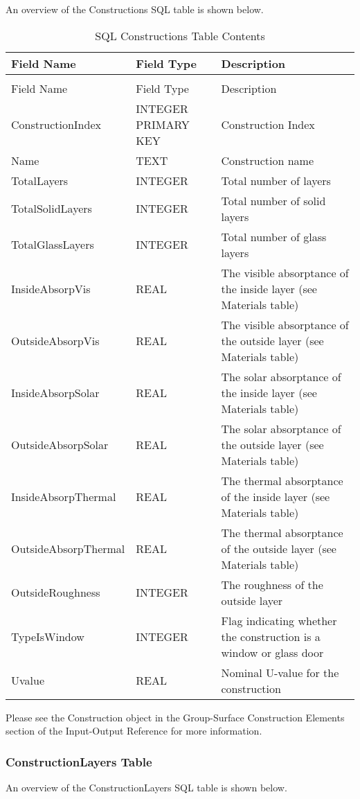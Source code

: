 An overview of the Constructions SQL table is shown below.

\begin{longtable}[c]{>{\raggedright}p{1.5in}>{\raggedright}p{1.5in}>{\raggedright}p{3.0in}}
\caption{SQL Constructions Table Contents \label{table:table-26.-sql-constructions-table-contents}} \tabularnewline
\toprule 
Field Name & Field Type & Description \tabularnewline
\midrule
\endfirsthead

\caption[]{SQL Constructions Table Contents} \tabularnewline
\toprule 
Field Name & Field Type & Description \tabularnewline
\midrule
\endhead

Construction\-Index & INTEGER PRIMARY KEY & Construction Index \tabularnewline
Name & TEXT & Construction name \tabularnewline
TotalLayers & INTEGER & Total number of layers \tabularnewline
TotalSolidLayers & INTEGER & Total number of solid layers \tabularnewline
TotalGlassLayers & INTEGER & Total number of glass layers \tabularnewline
InsideAbsorpVis & REAL & The visible absorptance of the inside layer (see Materials table) \tabularnewline
OutsideAbsorpVis & REAL & The visible absorptance of the outside layer (see Materials table) \tabularnewline
InsideAbsorpSolar & REAL & The solar absorptance of the inside layer (see Materials table) \tabularnewline
OutsideAbsorpSolar & REAL & The solar absorptance of the outside layer (see Materials table) \tabularnewline
InsideAbsorp\-Thermal & REAL & The thermal absorptance of the inside layer (see Materials table) \tabularnewline
OutsideAbsorp\-Thermal & REAL & The thermal absorptance of the outside layer (see Materials table) \tabularnewline
OutsideRoughness & INTEGER & The roughness of the outside layer \tabularnewline
TypeIsWindow & INTEGER & Flag indicating whether the construction is a window or glass door \tabularnewline
Uvalue & REAL & Nominal U-value for the construction \tabularnewline
\bottomrule
\end{longtable}

Please see the Construction object in the Group-Surface Construction Elements section of the Input-Output Reference for more information.

\subsubsection{ConstructionLayers Table}

An overview of the ConstructionLayers SQL table is shown below.

